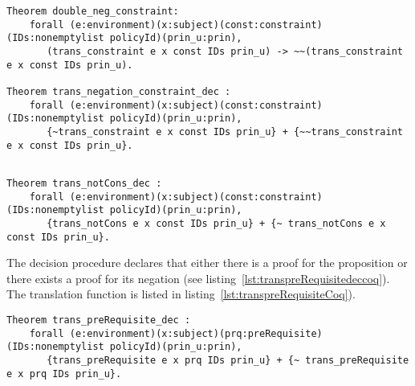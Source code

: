 \begin{lstlisting}
Theorem double_neg_constraint:
    forall (e:environment)(x:subject)(const:constraint)(IDs:nonemptylist policyId)(prin_u:prin),
       (trans_constraint e x const IDs prin_u) -> ~~(trans_constraint e x const IDs prin_u).
  
Theorem trans_negation_constraint_dec :
    forall (e:environment)(x:subject)(const:constraint)(IDs:nonemptylist policyId)(prin_u:prin),
       {~trans_constraint e x const IDs prin_u} + {~~trans_constraint e x const IDs prin_u}.
       
\end{lstlisting}

\begin{minipage}[c]{0.95\textwidth}
\begin{lstlisting}
Theorem trans_notCons_dec :
    forall (e:environment)(x:subject)(const:constraint)(IDs:nonemptylist policyId)(prin_u:prin),
       {trans_notCons e x const IDs prin_u} + {~ trans_notCons e x const IDs prin_u}.

\end{lstlisting}
\end{minipage}

The decision procedure  declares that either there is a proof for the proposition  or there exists a proof for its negation (see listing~\ref{lst:transpreRequisitedeccoq}). The translation function  is listed in listing~\ref{lst:transpreRequisiteCoq}). 


\begin{lstlisting}
Theorem trans_preRequisite_dec :
    forall (e:environment)(x:subject)(prq:preRequisite)(IDs:nonemptylist policyId)(prin_u:prin),
       {trans_preRequisite e x prq IDs prin_u} + {~ trans_preRequisite e x prq IDs prin_u}.
\end{lstlisting}


